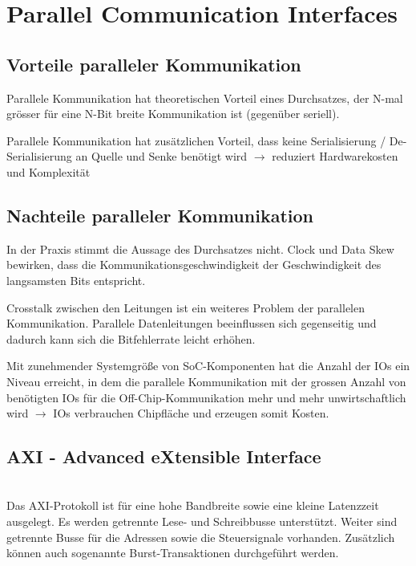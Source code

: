 \section{Parallel Communication Interfaces}
\subsection{Vorteile paralleler Kommunikation}
\begin{compactitem}
    \item Parallele Kommunikation hat theoretischen Vorteil eines Durchsatzes, der N-mal grösser für eine N-Bit breite Kommunikation ist (gegenüber seriell).
    \item Parallele Kommunikation hat zusätzlichen Vorteil, dass keine Serialisierung / De-Serialisierung an Quelle und Senke benötigt wird $\rightarrow$ reduziert Hardwarekosten und Komplexität
\end{compactitem}

\subsection{Nachteile paralleler Kommunikation}
\begin{compactitem}
    \item In der Praxis stimmt die Aussage des Durchsatzes nicht. Clock und Data Skew bewirken, dass die Kommunikationsgeschwindigkeit der Geschwindigkeit des langsamsten Bits entspricht.
    \item Crosstalk zwischen den Leitungen ist ein weiteres Problem der parallelen Kommunikation. Parallele Datenleitungen beeinflussen sich gegenseitig und dadurch kann sich die Bitfehlerrate leicht erhöhen.
    \item Mit zunehmender Systemgröße von SoC-Komponenten hat die Anzahl der IOs ein Niveau erreicht, in dem die parallele Kommunikation mit der grossen Anzahl von benötigten IOs für die Off-Chip-Kommunikation mehr und mehr unwirtschaftlich wird $\rightarrow$ IOs verbrauchen Chipfläche und erzeugen somit Kosten.
\end{compactitem}

\subsection{AXI - Advanced eXtensible Interface}$~$ \\
Das AXI-Protokoll ist für eine hohe Bandbreite sowie eine kleine Latenzzeit ausgelegt. Es werden getrennte Lese- und Schreibbusse unterstützt. Weiter sind getrennte Busse für die Adressen sowie die Steuersignale vorhanden. Zusätzlich können auch sogenannte Burst-Transaktionen durchgeführt werden.

